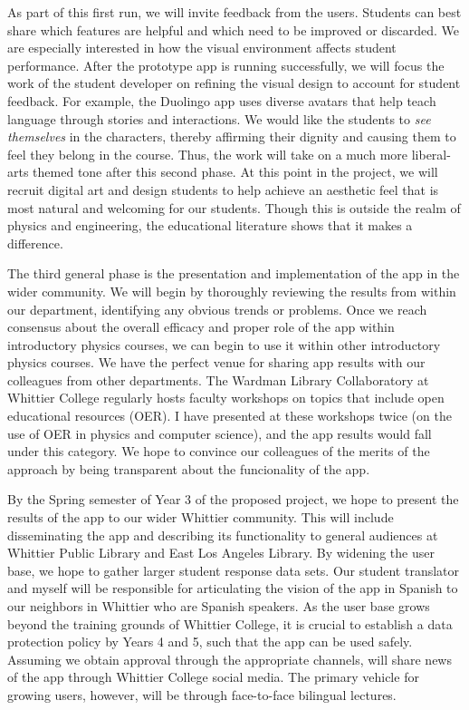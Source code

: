 \documentclass[../../main.tex]{subfiles}
\begin{document}
As part of this first run, we will invite feedback from the users.  Students can best share which features are helpful and which need to be improved or discarded.  We are especially interested in how the visual environment affects student performance.  After the prototype app is running successfully, we will focus the work of the student developer on refining the visual design to account for student feedback.  For example, the Duolingo app uses diverse avatars that help teach language through stories and interactions.  We would like the students to \textit{see themselves} in the characters, thereby affirming their dignity and causing them to feel they belong in the course.  Thus, the work will take on a much more liberal-arts themed tone after this second phase.  At this point in the project, we will recruit digital art and design students to help achieve an aesthetic feel that is most natural and welcoming for our students.  Though this is outside the realm of physics and engineering, the educational literature shows that it makes a difference. \\ \vspace{2.5mm}

The third general phase is the presentation and implementation of the app in the wider community.  We will begin by thoroughly reviewing the results from within our department, identifying any obvious trends or problems.  Once we reach consensus about the overall efficacy and proper role of the app within introductory physics courses, we can begin to use it within other introductory physics courses.  We have the perfect venue for sharing app results with our colleagues from other departments.  The Wardman Library Collaboratory at Whittier College regularly hosts faculty workshops on topics that include open educational resources (OER).  I have presented at these workshops twice (on the use of OER in physics and computer science), and the app results would fall under this category.  We hope to convince our colleagues of the merits of the approach by being transparent about the funcionality of the app. \\ \vspace{2.5mm}

By the Spring semester of Year 3 of the proposed project, we hope to present the results of the app to our wider Whittier community.  This will include disseminating the app and describing its functionality to general audiences at Whittier Public Library and East Los Angeles Library.  By widening the user base, we hope to gather larger student response data sets.  Our student translator and myself will be responsible for articulating the vision of the app in Spanish to our neighbors in Whittier who are Spanish speakers.  As the user base grows beyond the training grounds of Whittier College, it is crucial to establish a data protection policy by Years 4 and 5, such that the app can be used safely.  Assuming we obtain approval through the appropriate channels, will share news of the app through Whittier College social media.  The primary vehicle for growing users, however, will be through face-to-face bilingual lectures. \\ \vspace{2.5mm}
\end{document}
